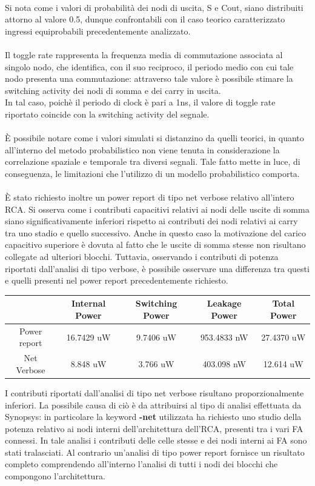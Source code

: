 \documentclass[11pt,  english, makeidx, a4paper, titlepage, oneside]{book}
\begin{document}
\\
Si nota come i valori di probabilità dei
nodi di uscita, S e Cout, siano distribuiti attorno al valore 0.5, dunque confrontabili con il caso teorico caratterizzato ingressi equiprobabili precedentemente analizzato.
\\\\
Il toggle rate rappresenta la frequenza media di commutazione associata al singolo nodo, che identifica, con il suo reciproco, il periodo medio
con cui tale nodo presenta una commutazione: attraverso tale valore è possibile stimare la switching activity dei nodi di somma e dei carry in uscita.
\\
In tal caso, poichè il periodo di clock è pari a 1ns, il valore di toggle rate riportato coincide con la switching activity del segnale.
\\\\
È possibile notare come i valori simulati si distanzino da quelli teorici, in quanto all'interno del metodo probabilistico non viene tenuta in considerazione la correlazione spaziale e temporale tra diversi segnali. Tale fatto mette in luce, di conseguenza, le limitazioni che l'utilizzo di un modello probabilistico comporta.
\\\\
È stato richiesto inoltre un power report di tipo net verbose relativo all'intero RCA. Si osserva come i contributi capacitivi relativi
ai nodi delle uscite di somma siano significativamente inferiori rispetto ai contributi dei nodi relativi ai carry tra uno stadio e quello successivo.
Anche in questo caso la motivazione del carico capacitivo superiore è dovuta al fatto che le uscite di somma stesse non risultano collegate ad ulteriori
blocchi. Tuttavia, osservando i contributi di potenza riportati dall'analisi di tipo verbose, è possibile osservare una differenza tra questi e 
quelli presenti nel power report precedentemente richiesto. 
\\
\begin{center}
	\begin{tabular}{|c|c|c|c|c|}
	\hline
	& Internal Power & Switching Power & Leakage Power & Total Power \\ 
	\hline
	Power report & 16.7429 uW & 9.7406 uW & 953.4833 nW & 27.4370 uW \\
	\hline
	Net Verbose & 8.848 uW & 3.766 uW & 403.098 nW & 12.614 uW \\
	\hline
	\end{tabular}
\end{center}
\vspace{0.3cm}
I contributi riportati dall'analisi di tipo net verbose risultano proporzionalmente inferiori. La possibile causa di ciò è da attribuirsi al tipo
di analisi effettuata da Synopsys: in particolare la keyword \textbf{-net} utilizzata ha richiesto uno studio della potenza relativo ai nodi interni
dell'architettura dell'RCA, presenti tra i vari FA connessi. In tale analisi i contributi delle celle stesse e dei nodi interni ai FA sono stati
tralasciati. Al contrario un'analisi di tipo power report fornisce un risultato completo comprendendo all'interno l'analisi di tutti i nodi dei
blocchi che compongono l'architettura.
\newpage
\end{document}
